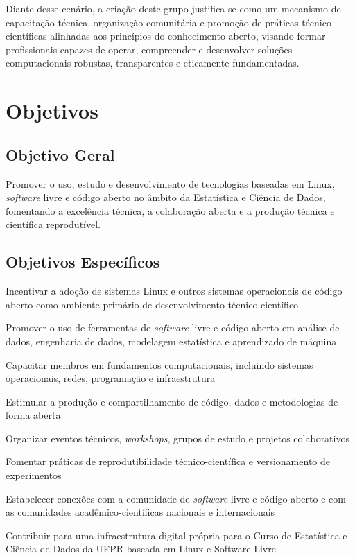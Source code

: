 \documentclass[
  12pt,          %
  a4paper,       %
  oneside,       %
  brazil         %
]{article}
\begin{document}
Diante desse cenário, a criação deste grupo justifica-se como um mecanismo de capacitação técnica, organização comunitária e promoção de 
práticas técnico-científicas alinhadas aos princípios do conhecimento aberto, visando formar profissionais capazes de operar, compreender e desenvolver 
soluções computacionais robustas, transparentes e eticamente fundamentadas.

\section{Objetivos}

\subsection{Objetivo Geral}

Promover o uso, estudo e desenvolvimento de tecnologias baseadas em Linux, \textit{software} livre e código aberto no âmbito da Estatística e Ciência de Dados, 
fomentando a excelência técnica, a colaboração aberta e a produção técnica e científica reprodutível.

\subsection{Objetivos Específicos}

\begin{conduta}
  \item Incentivar a adoção de sistemas Linux e outros sistemas operacionais de código aberto como ambiente primário de desenvolvimento técnico-científico
  \item Promover o uso de ferramentas de \textit{software} livre e código aberto em análise de dados, engenharia de dados, modelagem estatística e aprendizado de máquina
  \item Capacitar membros em fundamentos computacionais, incluindo sistemas operacionais, redes, programação e infraestrutura
  \item Estimular a produção e compartilhamento de código, dados e metodologias de forma aberta
  \item Organizar eventos técnicos, \textit{workshops}, grupos de estudo e projetos colaborativos
  \item Fomentar práticas de reprodutibilidade técnico-científica e versionamento de experimentos
  \item Estabelecer conexões com a comunidade de \textit{software} livre e código aberto e com as comunidades acadêmico-científicas nacionais e internacionais
  \item Contribuir para uma infraestrutura digital própria para o Curso de Estatística e Ciência de Dados da UFPR baseada em Linux e Software Livre
\end{conduta}
\end{document}
